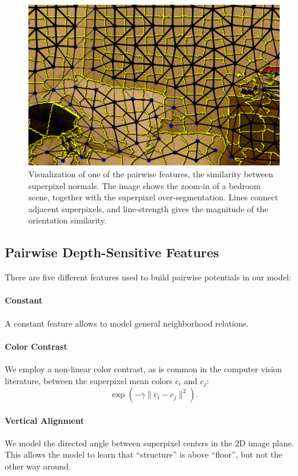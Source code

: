 \begin{figure}
    \begin{center}
        \includegraphics[width=\linewidth]{nyu/images/normal_feature}
    \end{center}
    \caption{%
        Visualization of one of the pairwise features, the similarity between superpixel normals.
        The image shows the zoom-in of a bedroom scene, together with the superpixel over-segmentation.
        Lines connect adjacent superpixels, and line-strength gives the magnitude of the orientation similarity.
    }
\end{figure}

\subsection{Pairwise Depth-Sensitive Features}
There are five different features used to build pairwise potentials in our model:

\paragraph{Constant}
    A constant feature allows to model general neighborhood relations.


\paragraph{Color Contrast}
    We employ a non-linear color contrast, as is common in the computer
    vision literature, between the superpixel mean colors $c_i$ and $c_j$:
    \[
        \exp\left(-\gamma \lVert c_i - c_j \rVert^2\right).
     \]


\paragraph{Vertical Alignment}
    We model the directed angle between superpixel centers in the 2D image
    plane.  This allows the  model to learn that ``structure'' is above
    ``floor'', but not the other way around.


